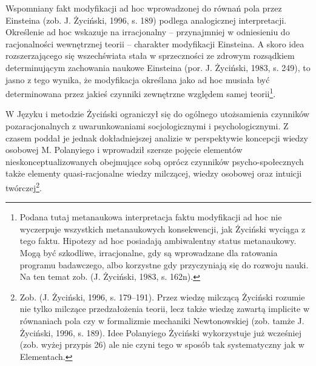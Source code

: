 \documentclass{article}
\begin{document}
Wspomniany fakt modyfikacji ad hoc wprowadzonej do równań pola przez Einsteina \label{ref:RNDuYYfgAN5No}(zob. J.
Życiński, 1996, s. 189) podlega analogicznej interpretacji. Określenie ad hoc wskazuje na irracjonalny – przynajmniej w
odniesieniu do racjonalności wewnętrznej teorii – charakter modyfikacji Einsteina. A skoro idea rozszerzającego się
wszechświata stała w sprzeczności ze zdrowym rozsądkiem determinującym zachowania naukowe Einsteina
\label{ref:RNDcdQNYoHSWz}(por. J. Życiński, 1983, s. 249), to jasno z tego wynika, że modyfikacja określana jako ad hoc
musiała być determinowana przez jakieś czynniki zewnętrzne względem samej teorii\footnote{Podana tutaj metanaukowa
interpretacja faktu modyfikacji ad hoc nie wyczerpuje wszystkich metanaukowych konsekwencji, jak Życiński wyciąga z
tego faktu. Hipotezy ad hoc posiadają ambiwalentny status metanaukowy. Mogą być szkodliwe, irracjonalne, gdy są
wprowadzane dla ratowania programu badawczego, albo korzystne gdy przyczyniają się do rozwoju nauki. Na ten temat zob.
\label{ref:RNDbdDBcwL7tT}(J. Życiński, 1983, s. 162n).}.

W Języku i metodzie Życiński ograniczył się do ogólnego utożsamienia czynników pozaracjonalnych z uwarunkowaniami
socjologicznymi i psychologicznymi. Z czasem poddał je jednak dokładniejszej analizie w perspektywie koncepcji wiedzy
osobowej M. Polanyiego i wprowadził szersze pojęcie elementów nieskonceptualizowanych obejmujące sobą oprócz czynników
psycho-społecznych także elementy quasi-racjonalne wiedzy milczącej, wiedzy osobowej oraz intuicji
twórczej\footnote{Zob. \label{ref:RNDTM62j2cxS8}(J. Życiński, 1996, s. 179–191). Przez wiedzę milczącą Życiński rozumie
nie tylko milczące przedzałożenia teorii, lecz także wiedzę zawartą implicite w równaniach pola czy w formalizmie
mechaniki Newtonowskiej \label{ref:RNDBBgSxRheRf}(zob. tamże J. Życiński, 1996, s. 189). Idee Polanyiego Życiński
wykorzystuje już wcześniej (zob. wyżej przypis 26) ale nie czyni tego w sposób tak systematyczny jak w Elementach.}.
\end{document}
